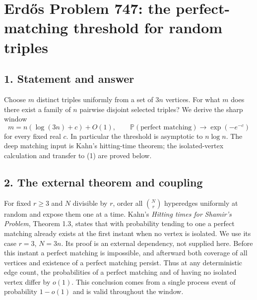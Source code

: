 \section*{Erd\H{o}s Problem 747: the perfect-matching threshold for random triples}
\subsection*{1. Statement and answer}
Choose $m$ distinct triples uniformly from a set of $3n$ vertices. For what $m$ does there exist a family of $n$ pairwise disjoint selected triples? We derive the sharp window
\[
 m=n(\log(3n)+c)+O(1),\qquad
 \mathbb P(\text{perfect matching})\longrightarrow\exp(-e^{-c}) \tag{1}
\]
for every fixed real $c$. In particular the threshold is asymptotic to $n\log n$. The deep matching input is Kahn's hitting-time theorem; the isolated-vertex calculation and transfer to (1) are proved below.
\subsection*{2. The external theorem and coupling}
For fixed $r\ge3$ and $N$ divisible by $r$, order all $\binom Nr$ hyperedges uniformly at random and expose them one at a time. Kahn's \emph{Hitting times for Shamir's Problem}, Theorem 1.3, states that with probability tending to one a perfect matching already exists at the first instant when no vertex is isolated. We use its case $r=3$, $N=3n$. Its proof is an external dependency, not supplied here.
Before this instant a perfect matching is impossible, and afterward both coverage of all vertices and existence of a perfect matching persist. Thus at any deterministic edge count, the probabilities of a perfect matching and of having no isolated vertex differ by $o(1)$. This conclusion comes from a single process event of probability $1-o(1)$ and is valid throughout the window.
